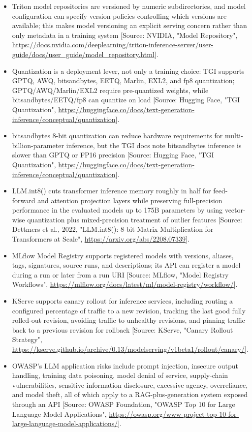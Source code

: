 \documentclass[11pt]{report}
\begin{document}
\begin{itemize}
\item Triton model repositories are versioned by numeric subdirectories, and model configuration can specify version policies controlling which versions are available; this makes model versioning an explicit serving concern rather than only metadata in a training system [Source: NVIDIA, "Model Repository", \url{https://docs.nvidia.com/deeplearning/triton-inference-server/user-guide/docs/user_guide/model_repository.html}].
\item Quantization is a deployment lever, not only a training choice: TGI supports GPTQ, AWQ, bitsandbytes, EETQ, Marlin, EXL2, and fp8 quantization; GPTQ/AWQ/Marlin/EXL2 require pre-quantized weights, while bitsandbytes/EETQ/fp8 can quantize on load [Source: Hugging Face, "TGI Quantization", \url{https://huggingface.co/docs/text-generation-inference/conceptual/quantization}].
\item bitsandbytes 8-bit quantization can reduce hardware requirements for multi-billion-parameter inference, but the TGI docs note bitsandbytes inference is slower than GPTQ or FP16 precision [Source: Hugging Face, "TGI Quantization", \url{https://huggingface.co/docs/text-generation-inference/conceptual/quantization}].
\item LLM.int8() cuts transformer inference memory roughly in half for feed-forward and attention projection layers while preserving full-precision performance in the evaluated models up to 175B parameters by using vector-wise quantization plus mixed-precision treatment of outlier features [Source: Dettmers et al., 2022, "LLM.int8(): 8-bit Matrix Multiplication for Transformers at Scale", \url{https://arxiv.org/abs/2208.07339}].
\item MLflow Model Registry supports registered models with versions, aliases, tags, signatures, source runs, and descriptions; its API can register a model during a run or later from a run URI [Source: MLflow, "Model Registry Workflows", \url{https://mlflow.org/docs/latest/ml/model-registry/workflow/}].
\item KServe supports canary rollout for inference services, including routing a configured percentage of traffic to a new revision, tracking the last good fully rolled-out revision, avoiding traffic to unhealthy revisions, and pinning traffic back to a previous revision for rollback [Source: KServe, "Canary Rollout Strategy", \url{https://kserve.github.io/archive/0.13/modelserving/v1beta1/rollout/canary/}].
\item OWASP's LLM application risks include prompt injection, insecure output handling, training data poisoning, model denial of service, supply-chain vulnerabilities, sensitive information disclosure, excessive agency, overreliance, and model theft, all of which apply to a RAG-plus-generation system exposed through an API [Source: OWASP Foundation, "OWASP Top 10 for Large Language Model Applications", \url{https://owasp.org/www-project-top-10-for-large-language-model-applications/}].

\end{itemize}
\end{document}

